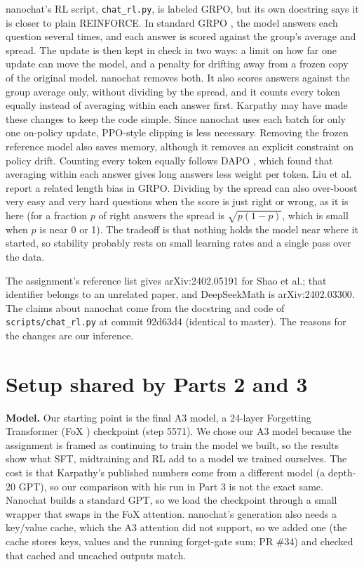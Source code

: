 \documentclass[10pt]{article}
\newcommand{\code}[1]{\texttt{#1}}
\begin{document}
nanochat's RL script, \code{chat\_rl.py}, is labeled GRPO, but its own docstring says it is closer to plain REINFORCE. In standard GRPO \cite{shao2024}, the model answers each question several times, and each answer is scored against the group's average and spread. The update is then kept in check in two ways: a limit on how far one update can move the model, and a penalty for drifting away from a frozen copy of the original model. nanochat removes both. It also scores answers against the group average only, without dividing by the spread, and it counts every token equally instead of averaging within each answer first. Karpathy may have made these changes to keep the code simple. Since nanochat uses each batch for only one on-policy update, PPO-style clipping is less necessary. Removing the frozen reference model also saves memory, although it removes an explicit constraint on policy drift. Counting every token equally follows DAPO \cite{yu2025dapo}, which found that averaging within each answer gives long answers less weight per token. Liu et al.\ \cite{liu2025} report a related length bias in GRPO. Dividing by the spread can also over-boost very easy and very hard questions when the score is just right or wrong, as it is here (for a fraction $p$ of right answers the spread is $\sqrt{p(1-p)}$, which is small when $p$ is near 0 or 1). The tradeoff is that nothing holds the model near where it started, so stability probably rests on small learning rates and a single pass over the data.

\footnotesize The assignment's reference list gives arXiv:2402.05191 for Shao et al.; that identifier belongs to an unrelated paper, and DeepSeekMath is arXiv:2402.03300. The claims about nanochat come from the docstring and code of \code{scripts/chat\_rl.py} at commit 92d63d4 (identical to master). The reasons for the changes are our inference.
\normalsize

\section*{Setup shared by Parts 2 and 3}

\textbf{Model.} Our starting point is the final A3 model, a 24-layer Forgetting Transformer (FoX \cite{fox}) checkpoint (step 5571). We chose our A3 model because the assignment is framed as continuing to train the model we built, so the results show what SFT, midtraining and RL add to a model we trained ourselves. The cost is that Karpathy's published numbers come from a different model (a depth-20 GPT), so our comparison with his run in Part 3 is not the exact same. Nanochat builds a standard GPT, so we load the checkpoint through a small wrapper that swaps in the FoX attention. nanochat's generation also needs a key/value cache, which the A3 attention did not support, so we added one (the cache stores keys, values and the running forget-gate sum; PR \#34) and checked that cached and uncached outputs match.
\end{document}
